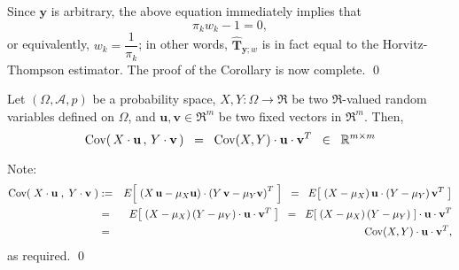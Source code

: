 \documentclass{article}
\begin{document}
Since $\mathbf{y}$ is arbitrary, the above equation immediately implies that
\begin{equation*}
\pi_{k}w_{k} - 1 = 0,
\end{equation*}
or equivalently, $w_{k} = \dfrac{1}{\pi_{k}}$; in other words,
$\widehat{\mathbf{T}}_{\mathbf{y};w}$ is in fact equal to the Horvitz-Thompson estimator.
The proof of the Corollary is now complete.
\qed

\begin{lemma}
\label{lemma:technical}
\mbox{}
\vskip 0.1cm
\noindent
Let $(\Omega,\mathcal{A},p)$ be a probability space,
$X, Y : \Omega \longrightarrow \Re$ be two $\Re$-valued random variables defined on $\Omega$,
and $\mathbf{u}, \mathbf{v} \in \Re^{m}$ be two fixed vectors in $\Re^{m}$.
Then,
\begin{equation*}
\textnormal{Cov}\!\left(\,X\cdot\mathbf{u}\,,\,Y\cdot\mathbf{v}\,\right)
\;\;=\;\;
\textnormal{Cov}(X,Y)\cdot\mathbf{u}\cdot\mathbf{v}^{T}
\;\;\in\;\; \mathbb{R}^{m \times m}
\end{equation*}
\end{lemma}

\proof
Note:
\begin{eqnarray*}
\textnormal{Cov}\!\left(\;X\cdot\mathbf{u}\;,\;Y\cdot\mathbf{v}\;\right)
&:=& E\!\left[\;\left(X\,\mathbf{u} - \mu_{X}\mathbf{u}\right)\cdot\left(Y\,\mathbf{v} - \mu_{Y}\mathbf{v}\right)^{T}\;\right]
\;\;=\;\; E\!\left[\;\left(X - \mu_{X}\right)\mathbf{u}\cdot\left(Y - \mu_{Y}\right)\mathbf{v}^{T}\;\right] \\
&=& E\!\left[\;\left(X - \mu_{X}\right)\left(Y - \mu_{Y}\right)\cdot\mathbf{u}\cdot\mathbf{v}^{T}\;\right] 
\;\;=\;\; E\!\left[\;\left(X - \mu_{X}\right)\left(Y - \mu_{Y}\right)\;\right]\cdot\mathbf{u}\cdot\mathbf{v}^{T} \\
&=& \textnormal{Cov}(X,Y)\cdot\mathbf{u}\cdot\mathbf{v}^{T},
\end{eqnarray*}
as required.
\qed
\end{document}

